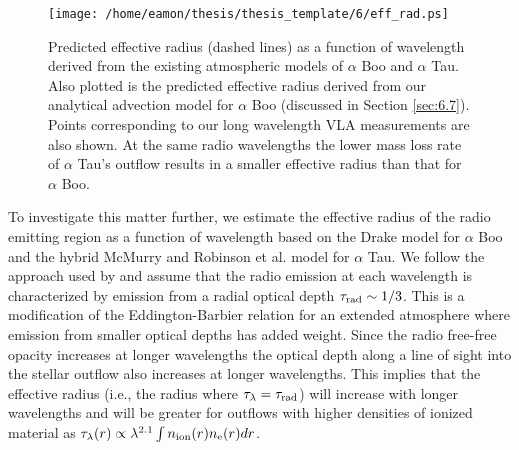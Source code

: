 \begin{figure}[hbt!]
\centering 
          \texttt{[image: /home/eamon/thesis/thesis\_template/6/eff\_rad.ps]}
\caption[Predicted effective radius as a function of wavelength for $\alpha$ Boo and $\alpha$ Tau.]{Predicted effective radius (dashed lines) as a function of wavelength derived from the existing atmospheric models of $\alpha$ Boo and $\alpha$ Tau.  Also plotted is the predicted effective radius derived from our analytical advection model for $\alpha$ Boo (discussed in Section \ref{sec:6.7}). Points corresponding to our long wavelength VLA measurements are also shown. At the same radio wavelengths the lower mass loss rate of $\alpha$ Tau's outflow results in a smaller effective radius than that for $\alpha$ Boo.}
\label{fig6.6.3}
\end{figure}

To investigate this matter further,  we estimate the effective radius of the radio emitting region as a function of wavelength based on the Drake model for $\alpha$ Boo and the hybrid McMurry and Robinson et al. model for $\alpha$ Tau. We follow the approach used by \cite{cassinelli_1977} and assume that the radio emission at each wavelength is characterized by emission from a radial optical depth $\tau _{\rm{rad}}\sim 1/3$. This is a modification of the Eddington-Barbier relation for an extended atmosphere where emission from smaller optical depths has added weight. Since the radio free-free opacity increases at longer wavelengths the optical depth along a line of sight into the stellar outflow also increases at longer wavelengths. This implies that the effective radius (i.e., the radius where $\tau _{\lambda} = \tau _{\rm{rad}}$) will increase with longer wavelengths and will be greater for outflows with higher densities of ionized material as $\tau _{\lambda}(r) \propto \lambda ^{2.1} \int n_{\rm{ion}}(r)n_{\rm{e}}(r) dr$. 

